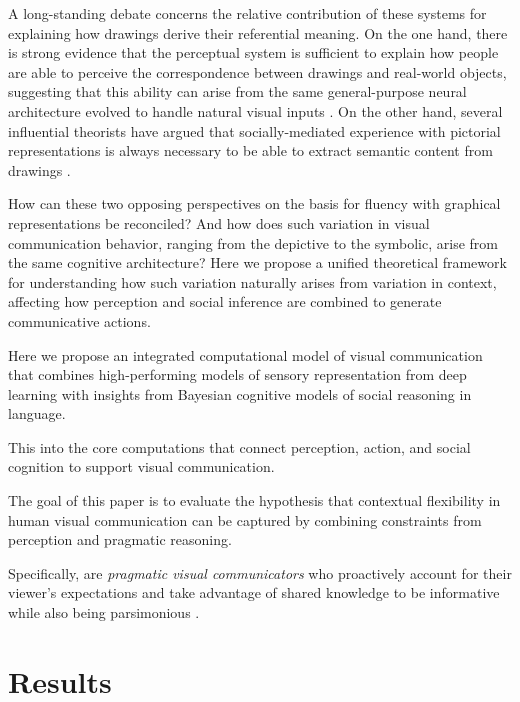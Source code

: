 \documentclass[9pt,twocolumn,twoside]{pnas-new}
\begin{document}
A long-standing debate concerns the relative contribution of these systems for explaining how drawings derive their referential meaning. On the one hand, there is strong evidence that the perceptual system is sufficient to explain how people are able to perceive the correspondence between drawings and real-world objects, suggesting that this ability can arise from the same general-purpose neural architecture evolved to handle natural visual inputs
\cite{fan2015common, yamins2014performance}. On the other hand, several influential theorists have argued that socially-mediated experience with pictorial representations is always necessary to be able to extract semantic content from drawings \cite{goodman1976languages,gombrich1989story}.

How can these two opposing perspectives on the basis for fluency with graphical representations be reconciled? And how does such variation in visual communication behavior, ranging from the depictive to the symbolic, arise from the same cognitive architecture? Here we propose a unified theoretical framework for understanding how such variation naturally arises from variation in context, affecting how perception and social inference are combined to generate communicative actions.


Here we propose an integrated computational model of visual communication that combines high-performing models of sensory representation from deep learning with insights from Bayesian cognitive models of social reasoning in language.

This  into the core computations that connect perception, action, and social cognition to support visual communication.


The goal of this paper is to evaluate the hypothesis that contextual flexibility in human visual communication can be captured by combining constraints from perception and pragmatic reasoning.

Specifically, are \emph{pragmatic visual communicators} who proactively account for their viewer's expectations and take advantage of shared knowledge to be informative
\cite{wilson1986relevance,goodman2016pragmatic}
while also being parsimonious \cite{zipf1936psycho}.




\section*{Results}
\end{document}
